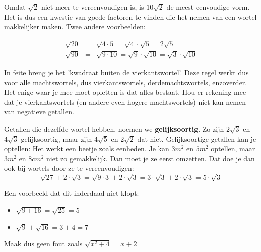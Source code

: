 Omdat $\sqrt{2}$ niet meer te vereenvoudigen is, is $10\sqrt{2}$ de meest eenvoudige vorm. Het is dus een kwestie van goede factoren te vinden die het nemen van een wortel makkelijker maken. Twee andere voorbeelden:

\begin{eqnarray*}
	\sqrt{20} &=& \sqrt{4 \cdot 5} = \sqrt{4}\cdot \sqrt{5} = 2\sqrt{5}\\
	\sqrt{90} &=& \sqrt{9 \cdot 10} = \sqrt{9} \cdot \sqrt{10} = \sqrt{3} \cdot \sqrt{10}
\end{eqnarray*}


In feite breng je het 'kwadraat buiten de vierkantswortel'. Deze regel werkt dus voor alle machtswortels, dus vierkantswortels, derdemachtswortels, enzoverder. Het enige waar je mee moet opletten is dat alles bestaat. Hou er rekening mee dat je vierkantswortels (en andere even hogere machtswortels) niet kan nemen van negatieve getallen.

Getallen die dezelfde wortel hebben, noemen we \textbf{gelijksoortig}. Zo zijn  $2\sqrt{3}$ en $4\sqrt{3}$ gelijksoortig, maar zijn $4\sqrt{5}$ en $2\sqrt{2}$ dat niet. Gelijksoortige getallen kan je optellen:
Het werkt een beetje zoals eenheden. Je kan $3m^2$ en $5m^2$ optellen, maar $3m^2$ en $8cm^2$ niet zo gemakkelijk. Dan moet je ze eerst omzetten. Dat doe je dan ook bij wortels door ze te vereenvoudigen:
\begin{equation*}
\sqrt{27}+2\cdot\sqrt{3}=\sqrt{9 \cdot 3}+2\cdot \sqrt{3}=3\cdot\sqrt{3}+2\cdot\sqrt{3}=5 \cdot \sqrt{3}
\end{equation*}



Een voorbeeld dat dit inderdaad niet klopt:
\begin{itemize}
	\item $\sqrt{9+16}=\sqrt{25}=5$
	\item $\sqrt{9}+\sqrt{16}=3+4=7$
\end{itemize}

Maak dus geen fout zoals $\sqrt{x^2+4}=x+2$

